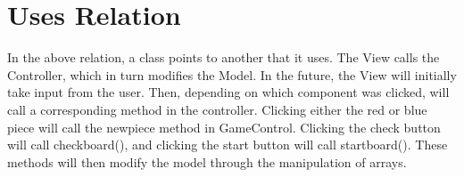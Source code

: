 \documentclass[12pt]{article}
\begin{document}
	\section{Uses Relation}
			\begin{figure}[!h]
				\centering
			\end{figure}
	In the above relation, a class points to another that it uses.
	The View calls the Controller, which in turn modifies the Model. In the future, the View will initially take input from the user. Then, depending on which component was clicked, will call a corresponding method in the controller. Clicking either the red or blue piece will call the newpiece method in GameControl. Clicking the check button will call checkboard(), and clicking the start button will call startboard(). These methods will then modify the model through the manipulation of arrays. \\
	\newpage
\end{document}
